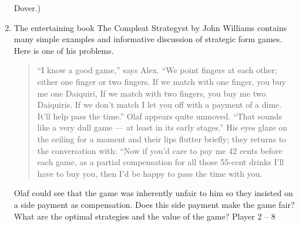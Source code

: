 \documentclass[]{report}
\begin{document}
\begin{enumerate}
Dover.)
\item  The entertaining book The Compleat Strategyst by John Williams contains many
simple examples and informative discussion of strategic form games. Here is one of his
problems.
\begin{quote}
“I know a good game,” says Alex. “We point fingers at each other; either
one finger or two fingers. If we match with one finger, you buy me one Daiquiri,
If we match with two fingers, you buy me two Daiquiris. If we don’t match I let
you off with a payment of a dime. It’ll help pass the time.”
Olaf appears quite unmoved. “That sounds like a very dull game — at least
in its early stages.” His eyes glaze on the ceiling for a moment and their lips flutter
briefly; they returns to the conversation with: “Now if you’d care to pay me 42
cents before each game, as a partial compensation for all those 55-cent drinks I’ll
have to buy you, then I’d be happy to pass the time with you.
\end{quote}
Olaf could see that the game was inherently unfair to him so they insisted on a side
payment as compensation. Does this side payment make the game fair? What are the
optimal strategies and the value of the game?
Player 2 – 8
\end{enumerate}
\end{document}
